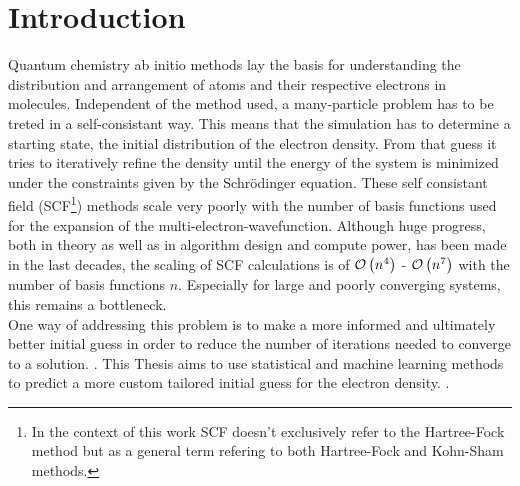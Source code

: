 \chapter{Introduction}
\label{sec:introduction}

Quantum chemistry ab initio methods lay the basis for understanding the distribution and arrangement of atoms and their respective electrons in molecules. Independent of the method used, a many-particle problem has to be treted in a self-consistant way. This means that the simulation has to determine a starting state,  the initial distribution of the electron density. From that guess it tries to iteratively refine the density until the energy of the system is minimized under the constraints given by the Schrödinger equation. These self consistant field (SCF\footnote{In the context of this work SCF doesn't exclusively refer to the Hartree-Fock method but as a general term refering to both Hartree-Fock and Kohn-Sham methods.}) methods scale very poorly with the number of basis functions used for the expansion of the multi-electron-wavefunction. Although huge progress, both in theory as well as in algorithm design and compute power, has been made in the last decades, the scaling of SCF calculations is of $\mathcal{O}\left(n^4\right)$ - $\mathcal{O}\left(n^7\right)$ with the number of basis functions $n$. Especially for large and poorly converging systems, this remains a bottleneck. \\
One way of addressing this problem is to make a more informed and ultimately better initial guess in order to reduce the number of iterations needed to converge to a solution. . This Thesis aims to use statistical and machine learning methods to predict a more custom tailored initial guess for the electron density. . 


